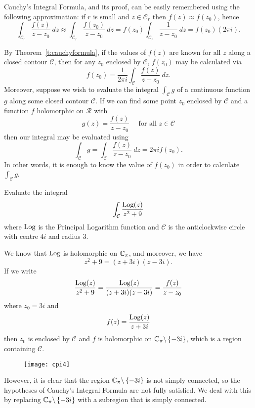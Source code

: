 \begin{note}
Cauchy's Integral Formula, and its proof, can be easily remembered using the following approximation: if $r$ is small and $z \in \mathcal{C}_r$ then $f(z) \approx f(z_0)$, hence
\[
\int_{\mathcal{C}_r} \frac{f(z)}{z-z_0}\ dz \approx \int_{\mathcal{C}_r} \frac{f(z_0)}{z-z_0}\ dz = f(z_0) \int_{\mathcal{C}_r} \frac{1}{z-z_0}\ dz = f(z_0) (2\pi i).
\]
\end{note}
By Theorem~\ref{t:cauchyformula}, if the values of $f(z)$ are known for all $z$ along a closed contour $ \mathcal{C}$, then for any $z_0$ enclosed by $\mathcal{C}$, $f(z_0)$ may be calculated via
\[
f(z_0)= \frac{1}{2\pi i} \int_{\mathcal{C}} \frac{f(z)}{z-z_0}\ dz.
\]
Moreover, suppose we wish to evaluate the integral $\int_{\mathcal{C}} g$ of a continuous function $g$ along some closed contour $\mathcal{C}$.  If we can find some point $z_0$ enclosed by $\mathcal{C}$ and a function $f$ holomorphic on $\mathcal{R}$ with 
\[
g(z) = \frac{f(z)}{z-z_0} \quad \text{ for all }z \in \mathcal{C}
\]
then our integral may be evaluated using
\[
\int_{\mathcal{C}} g = \int_{\mathcal{C}} \frac{f(z)}{z-z_0}\ dz =  2\pi i f(z_0).
\]
In other words, it is enough to know the value of $f(z_0)$ in order to calculate $\int_{\mathcal{C}}g$.
\begin{example}
Evaluate the integral
\[
\int_{\mathcal{C}} \frac{\operatorname{Log} (z)}{z^2+9}
\]
where $\operatorname{Log}$ is the Principal Logarithm function and $\mathcal{C}$ is the anticlockwise circle with centre $4i$ and radius $3$.
\end{example}
We know that $\operatorname{Log}$ is holomorphic on $\mathbb{C}_{\pi}$, and moreover, we have
\[
z^2+9 = (z+3i)(z-3i).
\]
If we write
\[
\frac{\operatorname{Log} (z)}{z^2+9} = \frac{\operatorname{Log} (z)}{(z+3i)(z-3i)} = \frac{f(z)}{z-z_0}
\]
where $z_0=3i$ and
\[
f(z) = \frac{\operatorname{Log} (z)}{z+3i}
\]
then $z_0$ is enclosed by $\mathcal{C}$ and $f$ is holomorphic on $\mathbb{C}_{\pi} \backslash \left\{-3i\right\}$, which is a region containing $\mathcal{C}$.
\begin{figure}[h]
\centering
\texttt{[image: cpi4]}
\end{figure}
However, it is clear that the region $\mathbb{C}_{\pi} \backslash \left\{-3i\right\}$ is not simply connected, so the hypotheses of Cauchy's Integral Formula are not fully satisfied.  We deal with this by replacing $\mathbb{C}_{\pi} \backslash \left\{-3i\right\}$ with a subregion that is simply connected.

